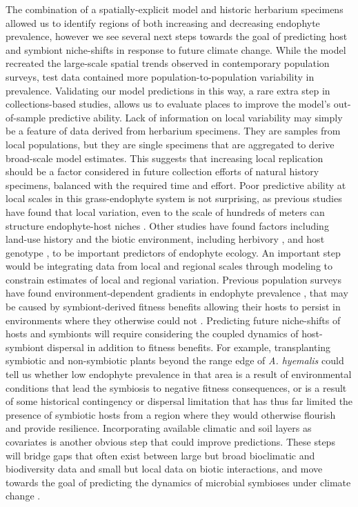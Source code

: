 \documentclass[11pt]{article}
\let\cite\citep
\begin{document}
The combination of a spatially-explicit model and historic herbarium specimens allowed us to identify regions of both increasing and decreasing endophyte prevalence, however we see several next steps towards the goal of predicting host and symbiont niche-shifts in response to future climate change.
While the model recreated the large-scale spatial trends observed in contemporary population surveys, test data contained more population-to-population variability in prevalence. 
Validating our model predictions in this way, a rare extra step in collections-based studies, allows us to evaluate places to improve the model's out-of-sample predictive ability.
Lack of information on local variability may simply be a feature of data derived from herbarium specimens. 
They are samples from local populations, but they are single specimens that are aggregated to derive broad-scale model estimates.
This suggests that increasing local replication should be a factor considered in future collection efforts of natural history specimens, balanced with the required time and effort.
Poor predictive ability at local scales in this grass-endophyte system is not surprising, as previous studies have found that local variation, even to the scale of hundreds of meters can structure endophyte-host niches \cite{kazenel2015mutualistic}. 
Other studies have found factors including land-use history \cite{vikuk2019infection} and the biotic environment, including herbivory \cite{rudgers2016long}, and host genotype \citet{sneck2017variation}, to be important predictors of endophyte ecology.
An important step would be integrating data from local and regional scales  through modeling to constrain estimates of local and regional variation.
Previous population surveys have found environment-dependent gradients in endophyte prevalence \citep{sneck2017variation,rudgers2009benefits,semmartin2015broad}, that may be caused by symbiont-derived fitness benefits allowing their hosts to persist in environments where they otherwise could not \citep{afkhami2014mutualist,kazenel2015mutualistic,fowler2023geographic}.
Predicting future niche-shifts of hosts and symbionts will require considering the coupled dynamics of host-symbiont dispersal in addition to fitness benefits.
For example, transplanting symbiotic and non-symbiotic plants beyond the range edge of \emph{A. hyemalis} could tell us whether low endophyte prevalence in that area is a result of environmental conditions that lead the symbiosis to negative fitness consequences, or is a result of some historical contingency or dispersal limitation that has thus far limited the presence of symbiotic hosts from a region where they would otherwise flourish and provide resilience.
Incorporating available climatic and soil layers as covariates is another obvious step that could improve predictions.
These steps will bridge gaps that often exist between large but broad bioclimatic and biodiversity data and small but local data on biotic interactions, and move towards the goal of predicting the dynamics of microbial symbioses under climate change \cite{miller2019recent, isaac2020data}.
\end{document}
